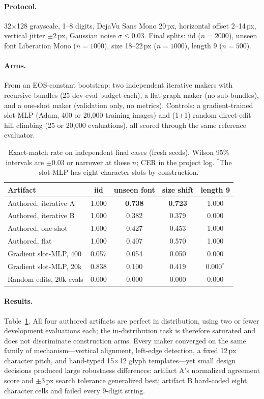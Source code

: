 \documentclass[11pt]{article}
\begin{document}
\paragraph{Protocol.} 32$\times$128 grayscale, 1--8 digits, DejaVu Sans Mono 20\,px, horizontal
offset 2--14\,px, vertical jitter $\pm2$\,px, Gaussian noise $\sigma\leq0.03$.
Final splits: iid ($n=2000$), unseen font Liberation Mono ($n=1000$), size 18--22\,px
($n=1000$), length 9 ($n=500$).

\paragraph{Arms.} From an EOS-constant bootstrap: two independent iterative makers with
recursive bundles (25 dev-eval budget each), a flat-graph maker (no sub-bundles), and a
one-shot maker (validation only, no metrics). Controls: a gradient-trained slot-MLP
(Adam, 400 or 20{,}000 training images) and (1+1) random direct-edit hill climbing
(25 or 20{,}000 evaluations), all scored through the same reference evaluator.

\begin{table}[t]
\centering\small
\begin{tabular}{lcccc}
\toprule
Artifact & iid & unseen font & size shift & length 9\\
\midrule
Authored, iterative A & 1.000 & \textbf{0.738} & \textbf{0.723} & 1.000\\
Authored, iterative B & 1.000 & 0.382 & 0.379 & 0.000\\
Authored, one-shot & 1.000 & 0.427 & 0.453 & 1.000\\
Authored, flat & 1.000 & 0.407 & 0.570 & 1.000\\
Gradient slot-MLP, 400 & 0.057 & 0.054 & 0.050 & 0.000\\
Gradient slot-MLP, 20k & 0.838 & 0.100 & 0.419 & 0.000$^\ast$\\
Random edits, 20k evals & 0.000 & 0.000 & 0.000 & 0.000\\
\bottomrule
\end{tabular}
\caption{Exact-match rate on independent final cases (fresh seeds). Wilson 95\% intervals
are $\pm$0.03 or narrower at these $n$; CER in the project log. $^\ast$The slot-MLP has eight
character slots by construction.}
\label{tab:r1}
\end{table}

\paragraph{Results.} Table~\ref{tab:r1}. All four authored artifacts are perfect in
distribution, using two or fewer development evaluations each; the in-distribution task is
therefore saturated and does not discriminate construction arms. Every maker converged on
the same family of mechanism---vertical alignment, left-edge detection, a fixed 12\,px
character pitch, and hand-typed 15$\times$12 glyph templates---yet small design decisions
produced large robustness differences: artifact A's normalized agreement score and
$\pm3$\,px search tolerance generalized best; artifact B hard-coded eight character cells and
failed every 9-digit string.
\end{document}
